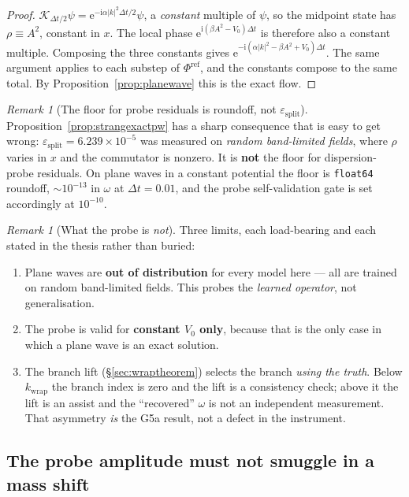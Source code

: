 \documentclass[11pt,a4paper]{article}
\theoremstyle{plain}
\theoremstyle{definition}
\theoremstyle{remark}
\newtheorem{remark}[theorem]{Remark}
\newcommand{\iu}{\mathrm{i}}
\newcommand{\eu}{\mathrm{e}}
\newcommand{\dt}{\Delta t}
\newcommand{\kwrap}{k_{\mathrm{wrap}}}
\newcommand{\epssplit}{\varepsilon_{\mathrm{split}}}
\newcommand{\Kop}{\mathcal{K}}
\newcommand{\Flow}{\Phi}
\newcommand{\code}[1]{\texttt{\small #1}}
\begin{document}
\begin{proof}
$\Kop_{\dt/2}\psi = \eu^{-\iu\alpha|k|^2\dt/2}\psi$, a \emph{constant} multiple of $\psi$,
so the midpoint state has $\rho \equiv A^2$, constant in $x$. The local phase
$\eu^{\iu(\beta A^2-V_0)\dt}$ is therefore also a constant multiple. Composing the three
constants gives $\eu^{-\iu(\alpha|k|^2 - \beta A^2 + V_0)\dt}$. The same argument applies
to each substep of $\Flow^{\mathrm{ref}}$, and the constants compose to the same total.
By Proposition~\ref{prop:planewave} this is the exact flow.
\end{proof}

\begin{remark}[The floor for probe residuals is roundoff, not $\epssplit$]
\label{rem:proberesidualfloor}
Proposition~\ref{prop:strangexactpw} has a sharp consequence that is easy to get wrong:
$\epssplit = 6.239\times10^{-5}$ was measured on \emph{random band-limited fields}, where
$\rho$ varies in $x$ and the commutator is nonzero. It is \textbf{not} the floor for
dispersion-probe residuals. On plane waves in a constant potential the floor is
\code{float64} roundoff, $\sim10^{-13}$ in $\omega$ at $\dt=0.01$, and the probe
self-validation gate is set accordingly at $10^{-10}$.
\end{remark}

\begin{remark}[What the probe is \emph{not}]
Three limits, each load-bearing and each stated in the thesis rather than buried:
\begin{enumerate}[label=(\roman*),leftmargin=1.8em,itemsep=0.2em]
\item Plane waves are \textbf{out of distribution} for every model here --- all are
trained on random band-limited fields. This probes the \emph{learned operator}, not
generalisation.
\item The probe is valid for \textbf{constant $V_0$ only}, because that is the only case
in which a plane wave is an exact solution.
\item The branch lift (\S\ref{sec:wraptheorem}) selects the branch \emph{using the truth}.
Below $\kwrap$ the branch index is zero and the lift is a consistency check; above it the
lift is an assist and the ``recovered'' $\omega$ is not an independent measurement. That
asymmetry \emph{is} the G5a result, not a defect in the instrument.
\end{enumerate}
\end{remark}

\subsection{The probe amplitude must not smuggle in a mass shift}
\label{sec:probeamp}
\end{document}

